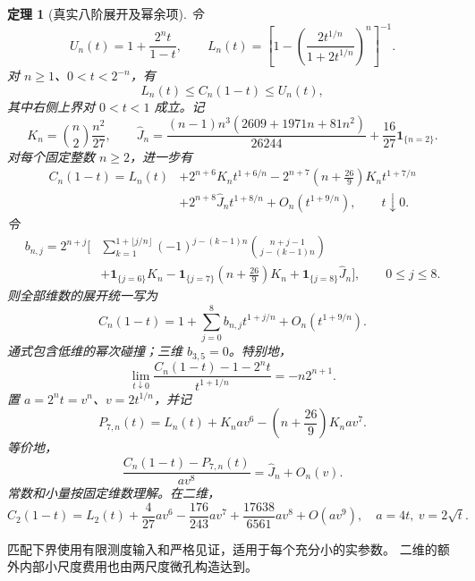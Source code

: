 \documentclass[UTF8,11pt,fontset=none]{ctexart}
\newtheorem{theorem}{定理}[section]
\theoremstyle{remark}
\newcommand{\ind}{\mathbf 1}
\newcommand{\Cn}{C_n}
\begin{document}
\begin{theorem}[真实八阶展开及幂余项]\label{thm:endpoint}
令
\[
 U_n(t)=1+\frac{2^nt}{1-t},\qquad
 L_n(t)=\left[1-\left(\frac{2t^{1/n}}{1+2t^{1/n}}\right)^n\right]^{-1}.
\]
对 \(n\ge1\)、\(0<t<2^{-n}\)，有
\begin{equation}\label{eq:envelopes}
 L_n(t)\le\Cn(1-t)\le U_n(t),
\end{equation}
其中右侧上界对 \(0<t<1\) 成立。记
\[
 K_n=\binom{n}{2}\frac{n^2}{27},\qquad
 \widehat J_n=\frac{(n-1)n^3(2609+1971n+81n^2)}{26244}
                   +\frac{16}{27}\ind_{\{n=2\}}.
\]
对每个固定整数 \(n\ge2\)，进一步有
\begin{equation}\label{eq:sharp}
 \begin{aligned}
 \Cn(1-t)=L_n(t)&+2^{n+6}K_nt^{1+6/n}
 -2^{n+7}\left(n+\frac{26}{9}\right)K_nt^{1+7/n}\\
 &+2^{n+8}\widehat J_nt^{1+8/n}+O_n(t^{1+9/n}),\qquad t\downarrow0.
 \end{aligned}
\end{equation}
令
\[
 \begin{aligned}
 b_{n,j}=2^{n+j}\Bigg[&\sum_{k=1}^{1+\lfloor j/n\rfloor}
 (-1)^{j-(k-1)n}\binom{n+j-1}{j-(k-1)n}\\
 &+\ind_{\{j=6\}}K_n
 -\ind_{\{j=7\}}\left(n+\frac{26}{9}\right)K_n
 +\ind_{\{j=8\}}\widehat J_n\Bigg],\qquad 0\le j\le8.
 \end{aligned}
\]
则全部维数的展开统一写为
\begin{equation}\label{eq:coefficients}
 \Cn(1-t)=1+\sum_{j=0}^{8}b_{n,j}t^{1+j/n}
              +O_n(t^{1+9/n}).
\end{equation}
通式包含低维的幂次碰撞；三维 \(b_{3,5}=0\)。特别地，
\[
 \lim_{t\downarrow0}
 \frac{\Cn(1-t)-1-2^nt}{t^{1+1/n}}=-n2^{n+1}.
\]
置 \(a=2^nt=v^n\)、\(v=2t^{1/n}\)，并记
\[
 P_{7,n}(t)=L_n(t)+K_nav^6-\left(n+\frac{26}{9}\right)K_nav^7.
\]
等价地，
\begin{equation}\label{eq:eighth-remainder}
 \frac{\Cn(1-t)-P_{7,n}(t)}{av^8}=\widehat J_n+O_n(v).
\end{equation}
常数和小量按固定维数理解。在二维，
\begin{equation}\label{eq:sharp-planar}
 C_2(1-t)=L_2(t)+\frac4{27}av^6-\frac{176}{243}av^7
             +\frac{17638}{6561}av^8+O(av^9),
 \quad a=4t,\ v=2\sqrt t.
\end{equation}
\end{theorem}

匹配下界使用有限测度输入和严格见证，适用于每个充分小的实参数。
二维的额外内部小尺度费用也由两尺度微孔构造达到。
\end{document}
